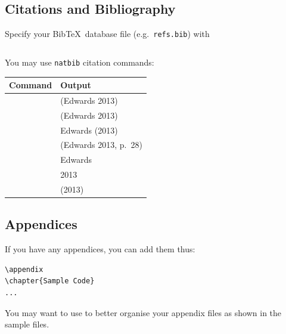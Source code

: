 \documentclass[a4paper,12pt]{scrartcl}
\begin{document}
\subsection{Citations and Bibliography}
Specify your Bib\TeX\ database file (e.g.~\texttt{refs.bib}) with

\begin{verbatim}

\end{verbatim}

You may use \texttt{natbib} citation commands:

\begin{center}
\begin{tabular}{ll}
\toprule
\bfseries\centering\arraybackslash Command & \bfseries\centering\arraybackslash Output\\
\midrule
\texttt{\cite{Edwards:2013}} & (Edwards 2013)\\
\texttt{\citep{Edwards:2013}} & (Edwards 2013)\\
\texttt{\citet{Edwards:2013}} & Edwards (2013)\\
\texttt{\cite[p.~28]{Edwards:2013}} & (Edwards 2013, p.~28)\\
\texttt{\citeauthor{Edwards:2013}} & Edwards\\
\texttt{\citeyear{Edwards:2013}} & 2013\\
\texttt{\citeyearpar{Edwards:2013}} & (2013)\\
\bottomrule
\end{tabular}
\end{center}

\subsection{Appendices}
If you have any appendices, you can add them thus:
\begin{verbatim}
\appendix
\chapter{Sample Code}
...
\end{verbatim}

You may want to use \texttt{} to better organise your appendix files as shown in the sample files.
\end{document}
